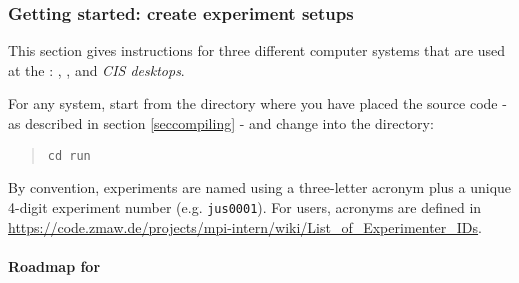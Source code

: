 \subsubsection{Getting started: create experiment setups}

This section gives instructions for three different computer systems that are
used at the \mpimet: \blizzard, \thunder, and \emph{CIS desktops}.

For any system, start from the directory where you have placed
the \echam{} source code - as described in section \ref{seccompiling} - and
change into the  directory:
\begin{quote}
\begin{verbatim}
cd run
\end{verbatim}
\end{quote}

By convention, experiments are named using a three-letter acronym plus a unique
4-digit experiment number (e.g. \verb|jus0001|). For \mpimet{} users, acronyms
are defined in
\url{https://code.zmaw.de/projects/mpi-intern/wiki/List_of_Experimenter_IDs}.

\paragraph*{Roadmap for \blizzard}
\label{runscripts:generation:blizzard}

